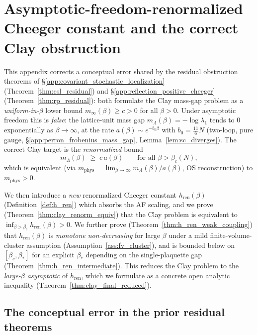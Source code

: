 \section{Asymptotic-freedom-renormalized Cheeger constant and
the correct Clay obstruction}
\label{app:af_renormalized_cheeger}

This appendix corrects a conceptual error shared by the residual
obstruction theorems of \S\ref{app:covariant_stochastic_localization}
(Theorem~\ref{thm:csl_residual}) and
\S\ref{app:reflection_positive_cheeger}
(Theorem~\ref{thm:rp_residual}): both formulate the Clay mass-gap
problem as a \emph{uniform-in-$\beta$} lower bound
$m_{\infty}(\beta)\ge c>0$ for all $\beta>0$. Under asymptotic
freedom this is \emph{false}: the lattice-unit mass gap
$m_{\Lambda}(\beta)=-\log\lambda_{1}$ tends to $0$ exponentially as
$\beta\to\infty$, at the rate $a(\beta)\sim e^{-b_{0}\beta}$ with
$b_{0}=\tfrac{11}{6}N$ (two-loop, pure gauge,
\S\ref{app:perron_frobenius_mass_gap}, Lemma~\ref{lem:sc_diverges}).
The correct Clay target is the \emph{renormalized} bound
\begin{equation}
\label{eq:af_target}
  m_{\Lambda}(\beta)\;\ge\;c\,a(\beta)
  \qquad\text{for all }\beta>\beta_{c}(N),
\end{equation}
which is equivalent (via $m_{\mathrm{phys}}=\lim_{\beta\to\infty}
m_{\Lambda}(\beta)/a(\beta)$, OS reconstruction) to
$m_{\mathrm{phys}}>0$.

We then introduce a \emph{new} renormalized Cheeger constant
$h_{\mathrm{ren}}(\beta)$ (Definition~\ref{def:h_ren}) which
absorbs the AF scaling, and we prove
(Theorem~\ref{thm:clay_renorm_equiv}) that the Clay problem is
equivalent to $\inf_{\beta>\beta_{c}}h_{\mathrm{ren}}(\beta)>0$.
We further prove (Theorem~\ref{thm:h_ren_weak_coupling}) that
$h_{\mathrm{ren}}(\beta)$ is \emph{monotone non-decreasing} for
large $\beta$ under a mild finite-volume-cluster assumption
(Assumption~\ref{ass:fv_cluster}), and is bounded below on
$[\beta_{c},\beta_{*}]$ for an explicit $\beta_{*}$ depending on
the single-plaquette gap (Theorem~\ref{thm:h_ren_intermediate}).
This reduces the Clay problem to the \emph{large-$\beta$ asymptotic}
of $h_{\mathrm{ren}}$, which we formulate as a concrete open
analytic inequality (Theorem~\ref{thm:clay_final_reduced}).

\subsection{The conceptual error in the prior residual theorems}
\label{ssec:conceptual_error}

